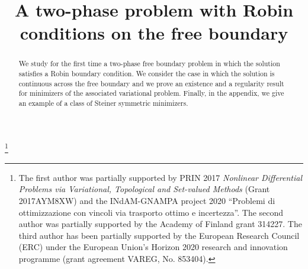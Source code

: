 \documentclass[JEP,XML,SOM,Unicode]{cedram}
\theoremstyle{plain}
\theoremstyle{definition}
\begin{document}
\frontmatter
\title{A two-phase problem with Robin conditions on the free boundary}

\author[\initial{S.} \lastname{Guarino Lo Bianco}]{ }
\address{Università degli studi di Napoli ``Federico II'', Dipartimento di Agraria\\
Via Università 100, 80055 Portici (NA), Italia}

\author[\initial{D. A.} \lastname{La Manna}]{ }
\address{University of Jyvaskylä, Department of Mathematics and Statistics,\\
P.O. Box 35 (MaD), FI-40014, Finland}

\author[\initial{B.} \lastname{Velichkov}]{ }
\address{Dipartimento di Matematica, Università di Pisa\\
Largo Bruno Pontecorvo, 5, 56127 Pisa, Italia}

\thanks{The first author was partially supported by PRIN 2017 {\it Nonlinear
Differential Problems via Variational, Topological and Set-valued Methods} (Grant 2017AYM8XW) and the INdAM-GNAMPA project 2020 ``Problemi di ottimizzazione con vincoli via trasporto ottimo e incertezza''.
The second author was partially supported by the Academy of Finland grant 314227.
The third author has been partially supported by the European Research Council (ERC) under the European Union's Horizon 2020 research and innovation programme (grant agreement VAREG, No. 853404).}

\begin{abstract}
We study for the first time a two-phase free boundary problem in which the solution satisfies a Robin boundary condition. We consider the case in which the solution is continuous across the free boundary and we prove an existence and a regularity result for minimizers of the associated variational problem. Finally, in the appendix, we give an example of a class of Steiner symmetric minimizers.
\end{abstract}



\end{document}
